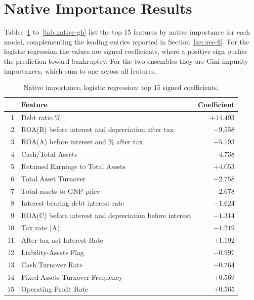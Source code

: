 \section{Native Importance Results}
\label{sec:app-native}

Tables~\ref{tab:native-lr} to~\ref{tab:native-gb} list the top $15$ features by
native importance for each model, complementing the leading entries reported in
Section~\ref{sec:res-fi}. For the logistic regression the values are signed
coefficients, where a positive sign pushes the prediction toward bankruptcy. For
the two ensembles they are Gini impurity importances, which sum to one across all
features.

\begin{table}[htbp]
  \centering
  \caption{Native importance, logistic regression: top 15 signed coefficients.}
  \label{tab:native-lr}
  \small
  \begin{tabular}{rlr}
    \toprule
    & \textbf{Feature} & \textbf{Coefficient} \\
    \midrule
    1  & Debt ratio \%                          & $+14.493$ \\
    2  & ROA(B) before interest and depreciation after tax & $-9.558$ \\
    3  & ROA(A) before interest and \% after tax & $-5.193$ \\
    4  & Cash/Total Assets                      & $-4.738$ \\
    5  & Retained Earnings to Total Assets      & $+4.053$ \\
    6  & Total Asset Turnover                   & $-2.758$ \\
    7  & Total assets to GNP price              & $-2.678$ \\
    8  & Interest-bearing debt interest rate    & $-1.624$ \\
    9  & ROA(C) before interest and depreciation before interest & $-1.314$ \\
    10 & Tax rate (A)                           & $-1.219$ \\
    11 & After-tax net Interest Rate            & $+1.192$ \\
    12 & Liability-Assets Flag                  & $-0.997$ \\
    13 & Cash Turnover Rate                     & $-0.764$ \\
    14 & Fixed Assets Turnover Frequency        & $+0.569$ \\
    15 & Operating Profit Rate                  & $+0.565$ \\
    \bottomrule
  \end{tabular}
\end{table}

